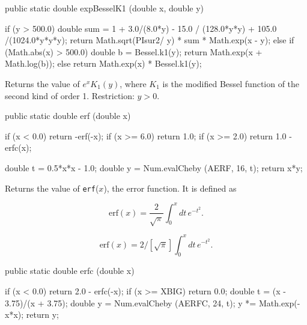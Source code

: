 \begin{htmlonly}
\end{htmlonly}
\begin{code}

   public static double expBesselK1 (double x, double y)\begin{hide} {
      if (y > 500.0) {
           double sum = 1 + 3.0/(8.0*y) - 15.0 / (128.0*y*y) + 105.0 /(1024.0*y*y*y);
           return Math.sqrt(PIsur2/ y) * sum * Math.exp(x - y);
      } else if (Math.abs(x) > 500.0) {
         double b = Bessel.k1(y);
         return Math.exp(x + Math.log(b));
      } else {
         return Math.exp(x) * Bessel.k1(y);
      }
   }\end{hide}
\end{code}
\begin{tabb}
Returns the value of $e^x K_1(y)$, where $ K_1$ is the modified Bessel
function of the second kind of order 1. Restriction: $y > 0$.
\end{tabb}
\begin{code}

   public static double erf (double x)\begin{hide} {
      if (x < 0.0)
         return -erf(-x);
      if (x >= 6.0)
         return 1.0;
      if (x >= 2.0)
         return 1.0 - erfc(x);

      double t = 0.5*x*x - 1.0;
      double y = Num.evalCheby (AERF, 16, t);
      return x*y;
   }\end{hide}
\end{code}
\begin{tabb}
Returns the value of \texttt{erf}($x$), the error function. It is defined as
\begin{latexonly}
\[
\mbox{erf}(x) = \frac2{\sqrt\pi}\int_0^x dt\, e^{-t^2}.
\]
\end{latexonly}
\begin{htmlonly}
\[
\mbox{erf}(x) = 2/[\sqrt\pi]\int_0^x dt\, e^{-t^2}.
\]
\end{htmlonly}
\begin{htmlonly}
\end{htmlonly}
\end{tabb}
\begin{code}

   public static double erfc (double x)\begin{hide} {
      if (x < 0.0)
         return 2.0 - erfc(-x);
      if (x >= XBIG)
         return 0.0;
      double t = (x - 3.75)/(x + 3.75);
      double y = Num.evalCheby (AERFC, 24, t);
      y *= Math.exp(-x*x);
      return y;
   }\end{hide}
\end{code}
